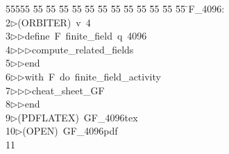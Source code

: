 %
%
\begin{tabbing}
55555 \= 55 \= 55 \= 55 \= 55 \= 55 \= 55 \= 55 \= 55 \= 55 \= 55 \= 55 \= 55 \= \>F\_4096:\\[0pt]
2\>$\triangleright$\>(ORBITER)\ v\ 4\ \\[0pt]
3\>$\triangleright$\>$\triangleright$\>define\ F\ finite\_field\ q\ 4096\ \\[0pt]
4\>$\triangleright$\>$\triangleright$\>$\triangleright$\>compute\_related\_fields\ \\[0pt]
5\>$\triangleright$\>$\triangleright$\>end\ \\[0pt]
6\>$\triangleright$\>$\triangleright$\>with\ F\ do\ finite\_field\_activity\ \\[0pt]
7\>$\triangleright$\>$\triangleright$\>$\triangleright$\>cheat\_sheet\_GF\ \\[0pt]
8\>$\triangleright$\>$\triangleright$\>end\\[0pt]
9\>$\triangleright$\>(PDFLATEX)\ GF\_4096tex\\[0pt]
10\>$\triangleright$\>(OPEN)\ GF\_4096pdf\\[0pt]
11\>\end{tabbing}
